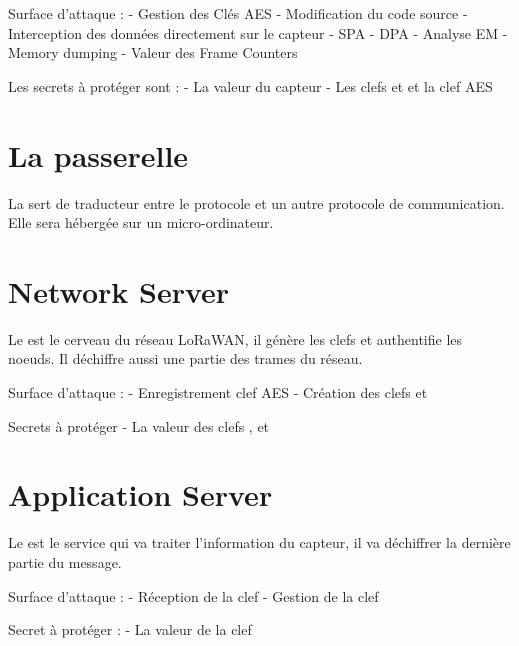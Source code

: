 \documentclass[letterpaper,10pt,french]{sphinxmanual}
\begin{document}
Surface d’attaque :
-  Gestion des Clés AES
-  Modification du code source
-  Interception des données directement sur le capteur
-  SPA
-  DPA
-  Analyse EM
-  Memory dumping
-  Valeur des Frame Counters

Les secrets à protéger sont :
-  La valeur du capteur
-  Les clefs  et  et la clef AES 


\section{La passerelle}
\label{\detokenize{specifications:la-passerelle}}
La  sert de traducteur entre le protocole  et un autre protocole de communication. Elle sera hébergée sur un micro-ordinateur.


\section{Network Server}
\label{\detokenize{specifications:network-server}}
Le  est le cerveau du réseau LoRaWAN, il génère les clefs et authentifie les noeuds. Il déchiffre aussi une partie des trames du réseau.

Surface d’attaque :
- Enregistrement clef AES
- Création des clefs  et 

Secrets à protéger
- La valeur des clefs ,  et 


\section{Application Server}
\label{\detokenize{specifications:application-server}}
Le  est le service qui va traiter l’information du capteur, il va déchiffrer la dernière partie du message.

Surface d’attaque :
- Réception de la clef 
- Gestion de la clef 

Secret à protéger :
- La valeur de la clef 
\end{document}
